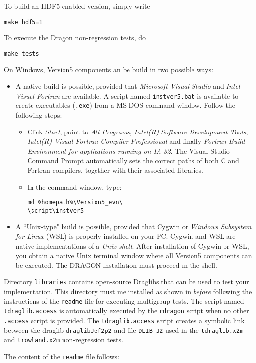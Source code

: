 \noindent To build an HDF5-enabled version, simply write
\begin{verbatim}
make hdf5=1
\end{verbatim}

\noindent To execute the Dragon non-regression tests, do
\begin{verbatim}
make tests
\end{verbatim}

\vskip 0.08cm

On Windows, Version5 components an be build in two possible ways:
\begin{itemize}
\item  A native build is possible, provided that {\sl Microsoft Visual Studio} and {\sl Intel Visual Fortran} are available.
A script named {\tt instver5.bat} is available to create executables ({\tt .exe}) from a MS-DOS command
window. Follow the following steps:
\begin{itemize}
\item Click {\sl Start}, point to {\sl All Programs}, {\sl Intel(R) Software Development Tools}, {\sl Intel(R) Visual Fortran
Compiler Professional} and finally {\sl Fortran Build Environment for applications running on IA-32}. The Visual Studio Command Prompt
automatically sets the correct paths of both C and Fortran compilers, together with their associated libraries.
\item In the command window, type:
\begin{verbatim}
md %homepath%\Version5_evn\
\script\instver5
\end{verbatim}
\end{itemize}
\item  A ``Unix-type" build is possible, provided that Cygwin\cite{cygwin} or {\sl Windows Subsystem for Linux} (WSL)\cite{wsl} is
properly installed on your PC. Cygwin and WSL are native implementations of a {\sl Unix shell}. After installation of Cygwin or WSL, you
obtain a native Unix terminal window where all Version5 components can be executed. The DRAGON installation must proceed in the shell.
\end{itemize}

\vskip 0.08cm

Directory {\tt libraries} contains open-source Draglibs that can be used to
test your implementation. This directory must me installed as shown in 
{\sl before} following the instructions of the {\tt readme} file for executing
multigroup tests. The script named
{\tt tdraglib.access} is automatically executed by the {\tt rdragon} script when
no other {\tt *.access} script is provided. The {\tt tdraglib.access} script creates
a symbolic link between the draglib {\tt draglibJef2p2} and file {\tt DLIB\_J2}
used in the {\tt tdraglib.x2m} and {\tt trowland.x2m} non-regression tests.

\vskip 0.08cm

The content of the {\tt readme} file follows:

